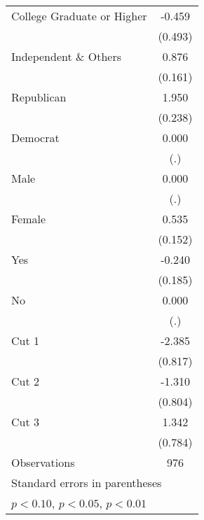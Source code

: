 \begin{table}[htbp]
\begin{tabular}{l*{1}{c}}
College Graduate or Higher&      -0.459         \\
                    &     (0.493)         \\
Independent \& Others&       0.876\sym{***}\\
                    &     (0.161)         \\
Republican          &       1.950\sym{***}\\
                    &     (0.238)         \\
Democrat            &       0.000         \\
                    &         (.)         \\
Male                &       0.000         \\
                    &         (.)         \\
Female              &       0.535\sym{***}\\
                    &     (0.152)         \\
Yes                 &      -0.240         \\
                    &     (0.185)         \\
No                  &       0.000         \\
                    &         (.)         \\
Cut 1               &      -2.385\sym{***}\\
                    &     (0.817)         \\
Cut 2               &      -1.310         \\
                    &     (0.804)         \\
Cut 3               &       1.342\sym{*}  \\
                    &     (0.784)         \\
\hline
Observations        &         976         \\
\hline\hline
\multicolumn{2}{l}{\footnotesize Standard errors in parentheses}\\
\multicolumn{2}{l}{\footnotesize \sym{*} \(p<0.10\), \sym{**} \(p<0.05\), \sym{***} \(p<0.01\)}\\
\end{tabular}
\end{table}
